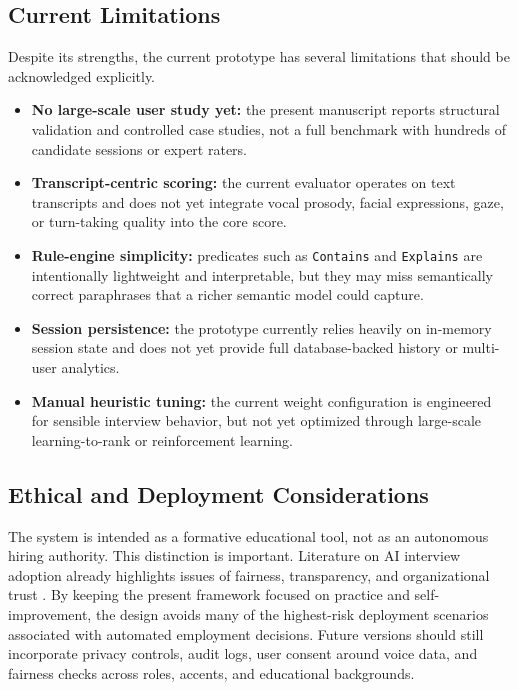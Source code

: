 \documentclass[conference]{IEEEtran}
\begin{document}
\subsection{Current Limitations}
Despite its strengths, the current prototype has several limitations that should be acknowledged explicitly.
\begin{itemize}
    \item \textbf{No large-scale user study yet:} the present manuscript reports structural validation and controlled case studies, not a full benchmark with hundreds of candidate sessions or expert raters.
    \item \textbf{Transcript-centric scoring:} the current evaluator operates on text transcripts and does not yet integrate vocal prosody, facial expressions, gaze, or turn-taking quality into the core score.
    \item \textbf{Rule-engine simplicity:} predicates such as \texttt{Contains} and \texttt{Explains} are intentionally lightweight and interpretable, but they may miss semantically correct paraphrases that a richer semantic model could capture.
    \item \textbf{Session persistence:} the prototype currently relies heavily on in-memory session state and does not yet provide full database-backed history or multi-user analytics.
    \item \textbf{Manual heuristic tuning:} the current weight configuration is engineered for sensible interview behavior, but not yet optimized through large-scale learning-to-rank or reinforcement learning.
\end{itemize}

\subsection{Ethical and Deployment Considerations}
The system is intended as a formative educational tool, not as an autonomous hiring authority. This distinction is important. Literature on AI interview adoption already highlights issues of fairness, transparency, and organizational trust \cite{r4}. By keeping the present framework focused on practice and self-improvement, the design avoids many of the highest-risk deployment scenarios associated with automated employment decisions. Future versions should still incorporate privacy controls, audit logs, user consent around voice data, and fairness checks across roles, accents, and educational backgrounds.
\end{document}
